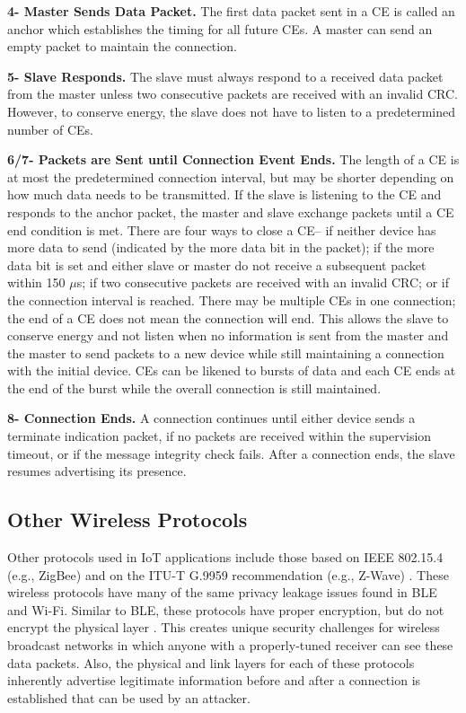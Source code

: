 \documentclass[12pt,letterpaper,oneside]{book}
\begin{document}
				\figChannel
				
				\textbf{4- Master Sends Data Packet.} The first data packet sent in a \ac{CE} is called an anchor which establishes the timing for all future \ac{CE}s. A master can send an empty packet to maintain the connection. 
				
				\textbf{5- Slave Responds.} The slave must always respond to a received data packet  from the master unless two consecutive packets are received with an invalid \ac{CRC}. However, to conserve energy, the slave does not have to listen to a predetermined number of \ac{CE}s.
				
				\textbf{6/7- Packets are Sent until Connection Event Ends.} The length of a \ac{CE} is at most the predetermined connection interval, but may be shorter depending on how much data needs to be transmitted. If the slave is listening to the \ac{CE} and responds to the anchor packet, the master and slave exchange packets until a \ac{CE} end condition is met. There are four ways to close a \ac{CE}-- if neither device has more data to send (indicated by the more data bit in the packet); if the more data bit is set and either slave or master do not receive a subsequent packet within 150 $\mu$s; if two consecutive packets are received with an invalid \ac{CRC}; or if the connection interval is reached. There may be multiple \ac{CE}s in one connection; the end of a \ac{CE} does not mean the connection will end. This allows the slave to conserve energy and not listen when no information is sent from the master and the master to send packets to a new device while still maintaining a connection with the initial device. \ac{CE}s can be likened to bursts of data and each \ac{CE} ends at the end of the burst while the overall connection is still maintained.
				
				\textbf{8- Connection Ends.} A connection continues until either device sends a terminate indication packet, if no packets are received within the supervision timeout, or if the message integrity check fails. After a connection ends, the slave resumes advertising its presence.
			
			\subsection{Other Wireless Protocols}
			Other protocols used in \ac{IoT} applications include those based on IEEE 802.15.4 (e.g., ZigBee) and on the ITU-T G.9959 recommendation (e.g., Z-Wave) \cite{Sharma}. These wireless protocols have many of the same privacy leakage issues found in \ac{BLE} and Wi-Fi. Similar to \ac{BLE}, these protocols have proper encryption, but do not encrypt the physical layer \cite{Sharma}. This creates unique security challenges for wireless broadcast networks in which anyone with a properly-tuned receiver can see these data packets. Also, the physical and link layers for each of these protocols inherently advertise legitimate information before and after a connection is established that can be used by an attacker. 
			
\end{document}
